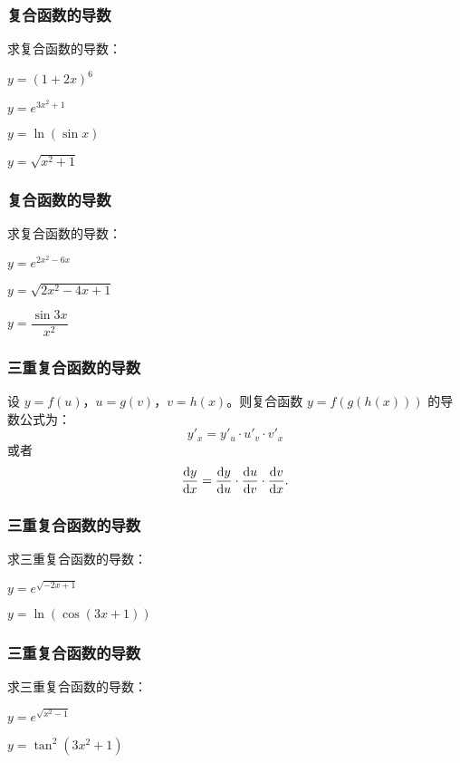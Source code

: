 \documentclass[14pt,notheorems,leqno,xcolor={rgb}]{beamer} %
\begin{document}
\begin{frame}
\frametitle{复合函数的导数}
\begin{example}
求复合函数的导数：
\begin{enumlite}[<+->]
  \item $y=(1+2x)^6$
  \item $y=e^{3x^2+1}$
  \item $y=\ln(\sin x)$
  \item $y=\sqrt{x^2+1}$
\end{enumlite}
\end{example}
\end{frame}

\begin{oframe}
\frametitle{复合函数的导数}
\begin{exercise}
求复合函数的导数：
\begin{enumlite}
  \item $y=e^{2x^2-6x}$
  \item $y=\sqrt{2x^2-4x+1}$\pause
  \item $y=\dfrac{\sin 3x}{x^2}$
\end{enumlite}
\end{exercise}
\end{oframe}

\begin{frame}
\frametitle{三重复合函数的导数}
\begin{remark}
设 $y=f(u)$，$u=g(v)$，$v=h(x)$。则复合函数 $y=f(g(h(x)))$ 的导数公式为：
\[ y'_x = y'_u \cdot u'_v \cdot v'_x \]
\pause 或者
\[ \frac{\d y}{\d x}=\frac{\d y}{\d u}\cdot\frac{\d u}{\d v}\cdot\frac{\d v}{\d x}.\]
\end{remark}
\end{frame}

\begin{frame}
\frametitle{三重复合函数的导数}
\begin{example}
求三重复合函数的导数：
\begin{enumlite}[<+->]
  \item $y=e^{\sqrt{-2x+1}}$
  \item $y=\ln(\cos(3x+1))$
\end{enumlite}
\end{example}
\end{frame}

\begin{oframe}
\frametitle{三重复合函数的导数}
\begin{exercise}
求三重复合函数的导数：
\begin{enumlite}
  \item $y=e^{\sqrt{x^2-1}}$
  \item $y=\tan^2(3x^2+1)$
\end{enumlite}
\end{exercise}
\end{oframe}
\end{document}

